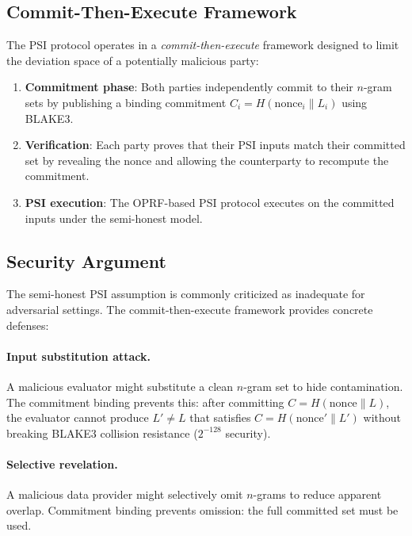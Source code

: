 \documentclass[11pt]{article}
\begin{document}
\subsection{Commit-Then-Execute Framework}

The PSI protocol operates in a \emph{commit-then-execute} framework
designed to limit the deviation space of a potentially malicious party:

\begin{enumerate}[nosep]
\item \textbf{Commitment phase}: Both parties independently commit to
  their $n$-gram sets by publishing a binding commitment
  $C_i = H(\text{nonce}_i \| L_i)$ using BLAKE3.
\item \textbf{Verification}: Each party proves that their PSI inputs
  match their committed set by revealing the nonce and allowing the
  counterparty to recompute the commitment.
\item \textbf{PSI execution}: The OPRF-based PSI protocol executes
  on the committed inputs under the semi-honest model.
\end{enumerate}

\subsection{Security Argument}

The semi-honest PSI assumption is commonly criticized as inadequate
for adversarial settings.  The commit-then-execute framework provides
concrete defenses:

\paragraph{Input substitution attack.}
A malicious evaluator might substitute a clean $n$-gram set to hide
contamination.  The commitment binding prevents this: after
committing $C = H(\text{nonce} \| L)$, the evaluator cannot produce
$L' \neq L$ that satisfies $C = H(\text{nonce}' \| L')$ without
breaking BLAKE3 collision resistance ($2^{-128}$ security).

\paragraph{Selective revelation.}
A malicious data provider might selectively omit $n$-grams to reduce
apparent overlap.  Commitment binding prevents omission: the full
committed set must be used.
\end{document}
